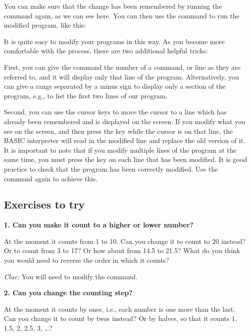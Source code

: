 You can make sure that the change has been remembered by running the  command again, as we can see here.
You can then use the  command to run the modified
program, like this:


It is quite easy to modify your programs in this way.  As you become more comfortable with the process, there are two
additional helpful tricks:

First, you can give the  command the number of a command, or line as they are referred to, and it will display only
that line of the program.  Alternatively, you can give a range separated by a minus sign to display only a section of the program,
e.g.,  to list the first two lines of our program.

Second, you can use the cursor keys to move the cursor to a line which has already been remembered and is displayed on the screen. If you
modify what you see on the screen, and then press the  key while the cursor is on that line, the BASIC interpreter will
read in the modified line and replace the old version of it.  It is important to note that if you modify multiple lines of the program
at the same time, you must press the  key on each line that has been modified. It is good practice to check that the
program has been correctly modified. Use the  command again to achieve this.


  \subsection{Exercises to try}

  {\bf 1. Can you make it count to a higher or lower number?}

  At the moment it counts from 1 to 10.  Can you change it to count to 20 instead?  Or to count from 3 to 17?
  Or how about from 14.5 to 21.5? What do you think you would need to reverse the order in which it counts?

  {\em Clue:} You will need to modify the  command.

  {\bf 2. Can you change the counting step?}

  At the moment it counts by ones, i.e., each number is one more than the last.  Can you change it to count by twos
  instead? Or by halves, so that it counts 1, 1.5, 2, 2.5, 3, \ldots?

